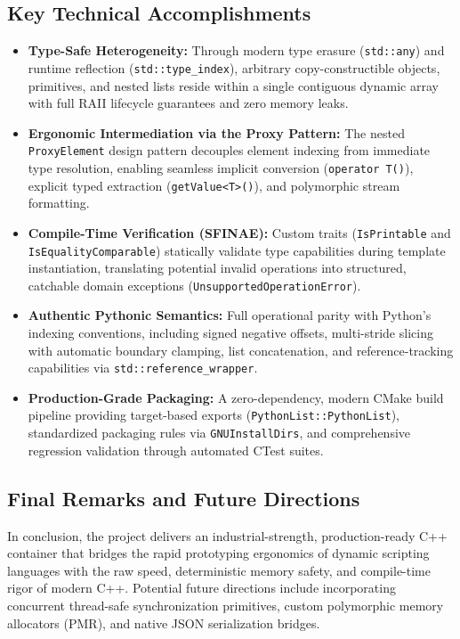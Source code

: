 \documentclass[12pt,a4paper]{report}
\begin{document}
\subsection{Key Technical Accomplishments}
\begin{itemize}
    \item \textbf{Type-Safe Heterogeneity:} Through modern type erasure (\texttt{std::any}) and runtime reflection (\texttt{std::type\_\allowbreak index}), arbitrary copy-constructible objects, primitives, and nested lists reside within a single contiguous dynamic array with full RAII lifecycle guarantees and zero memory leaks.
    
    \item \textbf{Ergonomic Intermediation via the Proxy Pattern:} The nested \texttt{ProxyElement} design pattern decouples element indexing from immediate type resolution, enabling seamless implicit conversion (\texttt{operator T()}), explicit typed extraction (\texttt{getValue<T>()}), and polymorphic stream formatting.
    
    \item \textbf{Compile-Time Verification (SFINAE):} Custom traits (\texttt{IsPrintable} and\newline
    \texttt{Is\-Equality\-Comparable}) statically validate type capabilities during template instantiation, translating potential invalid operations into structured, catchable domain exceptions\newline
    (\texttt{Un\-sup\-port\-ed\-Op\-er\-a\-tion\-Er\-ror}).
    
    \item \textbf{Authentic Pythonic Semantics:} Full operational parity with Python's indexing conventions, including signed negative offsets, multi-stride slicing with automatic boundary clamping, list concatenation, and reference-tracking capabilities via \texttt{std::reference\_\allowbreak wrapper}.
    
    \item \textbf{Production-Grade Packaging:} A zero-dependency, modern CMake build pipeline providing target-based exports (\texttt{PythonList::\allowbreak PythonList}), standardized packaging rules via \texttt{GNUInstallDirs}, and comprehensive regression validation through automated CTest suites.
\end{itemize}

\subsection{Final Remarks and Future Directions}
In conclusion, the project delivers an industrial-strength, production-ready C++ container that bridges the rapid prototyping ergonomics of dynamic scripting languages with the raw speed, deterministic memory safety, and compile-time rigor of modern C++. Potential future directions include incorporating concurrent thread-safe synchronization primitives, custom polymorphic memory allocators (PMR), and native JSON serialization bridges.
\end{document}
